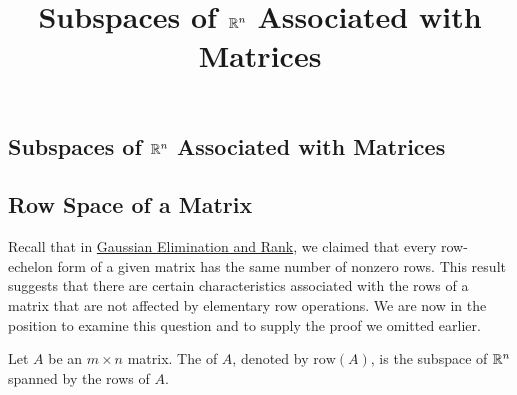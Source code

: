\documentclass{ximera}
\title{Subspaces of $\mathbb{R}^n$ Associated with Matrices} \license{CC BY-NC-SA 4.0}
\begin{document}
\begin{abstract}

\end{abstract}
\maketitle

\begin{onlineOnly}
\section*{Subspaces of $\mathbb{R}^n$ Associated with Matrices}
\end{onlineOnly}


\subsection*{Row Space of a Matrix}
Recall that in \href{https://ximera.osu.edu/linearalgebradzv3/LinearAlgebraInteractiveIntro/SYS-0030/main}{Gaussian Elimination and Rank}, we claimed that every row-echelon form of a given matrix has the same number of nonzero rows.  This result suggests that there are certain characteristics associated with the rows of a matrix that are not affected by elementary row operations.  We are now in the position to examine this question and to supply the proof we omitted earlier.
\begin{definition}\label{def:rowspace} Let $A$ be an $m\times n$ matrix.  The  of $A$, denoted by $\mbox{row}(A)$, is the subspace of $\mathbb{R}^n$ spanned by the rows of $A$.
\end{definition}
\end{document}
